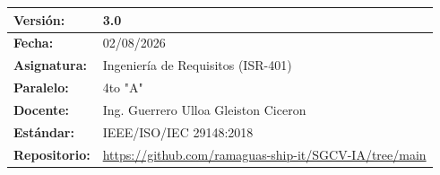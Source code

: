 \documentclass[
]{article}
\newcounter{none} %
\begin{document}
{\def\LTcaptype{none} %
\begin{longtable}[]{@{}
  >{\raggedright\arraybackslash}p{}
  >{\raggedright\arraybackslash}p{}@{}}
\toprule\noalign{}
\begin{minipage}[b]{\linewidth}\raggedright
\textbf{Versión:}
\end{minipage} & \begin{minipage}[b]{\linewidth}\raggedright
3.0
\end{minipage} \\
\midrule\noalign{}
\endhead
\bottomrule\noalign{}
\endlastfoot
\begin{minipage}[t]{\linewidth}\raggedright
\textbf{Fecha:}
\end{minipage} & \begin{minipage}[t]{\linewidth}\raggedright
02/08/2026
\end{minipage} \\
\begin{minipage}[t]{\linewidth}\raggedright
\textbf{Asignatura:}
\end{minipage} & \begin{minipage}[t]{\linewidth}\raggedright
Ingeniería de Requisitos (ISR-401)
\end{minipage} \\
\begin{minipage}[t]{\linewidth}\raggedright
\textbf{Paralelo:}
\end{minipage} & \begin{minipage}[t]{\linewidth}\raggedright
4to "A"
\end{minipage} \\
\begin{minipage}[t]{\linewidth}\raggedright
\textbf{Docente:}
\end{minipage} & \begin{minipage}[t]{\linewidth}\raggedright
Ing. Guerrero Ulloa Gleiston Ciceron
\end{minipage} \\
\begin{minipage}[t]{\linewidth}\raggedright
\textbf{Estándar:}
\end{minipage} & \begin{minipage}[t]{\linewidth}\raggedright
IEEE/ISO/IEC 29148:2018
\end{minipage} \\
\begin{minipage}[t]{\linewidth}\raggedright
\textbf{Repositorio:}
\end{minipage} & \begin{minipage}[t]{\linewidth}\raggedright
\url{https://github.com/ramaguas-ship-it/SGCV-IA/tree/main}
\end{minipage} \\
\end{longtable}
}
\end{document}
